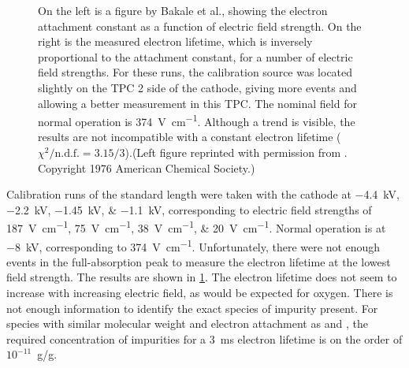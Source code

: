 \documentclass[herrin-thesis.tex]{subfiles}
\begin{document}
\begin{figure}[tbp]
\begin{subfigure}[b]{0.55\linewidth}
\end{subfigure}
\caption[Electron lifetime vs. electric field]{On the left is a figure by Bakale et al., showing the electron attachment constant as a function of electric field strength. On the right is the measured electron lifetime, which is inversely proportional to the attachment constant, for a number of electric field strengths. For these runs, the calibration source was located slightly on the TPC 2 side of the cathode, giving more events and allowing a better measurement in this TPC. The nominal field for normal operation is \SI{374}{\V\per\cm}. Although a trend is visible, the results are not incompatible with a constant electron lifetime (\(\chi^2/\text{n.d.f.} = 3.15/3\)).(Left figure reprinted with permission from \cite{Bakale:1976ly}. Copyright 1976 American Chemical Society.)}
\label{fig:el_attachment_vs_efield}
\label{fig:el_lifetime_vs_efield}
\end{figure}

Calibration runs of the standard length were taken with the cathode at \SIlist{-4.4;-2.2;-1.45; -1.1}{\kilo\V}, corresponding to electric field strengths of \SIlist{187;75;38;20}{\V\per\cm}. Normal operation is at \SI{-8}{\kilo\V}, corresponding to \SI{374}{\V\per\cm}. Unfortunately, there were not enough events in the full-absorption peak to measure the electron lifetime at the lowest field strength. The results are shown in \cref{fig:el_lifetime_vs_efield}. The electron lifetime does not seem to increase with increasing electric field, as would be expected for oxygen. There is not enough information to identify the exact species of impurity present. For species with similar molecular weight and electron attachment as  and , the required concentration of impurities for a \SI{3}{\ms} electron lifetime is on the order of \(10^{-11}\)~\si[per-mode=symbol]{\g\per\g}.

%
%
\end{document}
